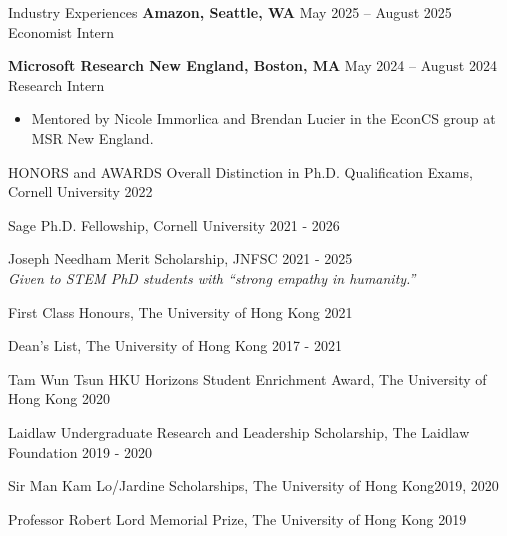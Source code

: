 \documentclass{resume} %
\begin{document}
\begin{rSection}{Industry Experiences}
  {\bf Amazon, Seattle, WA} \hfill {May 2025 -- August 2025} \\
  Economist Intern \vspace{-0.5em}

  {\bf Microsoft Research New England, Boston, MA} \hfill {May 2024 -- August 2024} \\
  Research Intern \vspace{-0.5em}
  \begin{itemize}
    \itemsep-0.5em 
    \item Mentored by Nicole Immorlica and Brendan Lucier in the EconCS group at MSR New England.
  \end{itemize} 
  
\end{rSection}

\begin{rSection}{HONORS and AWARDS}
Overall Distinction in Ph.D. Qualification Exams, Cornell University \hfill 2022

Sage Ph.D. Fellowship, Cornell University \hfill 2021 - 2026

Joseph Needham Merit Scholarship, JNFSC \hfill 2021 - 2025 \\
\emph{Given to STEM PhD students with ``strong empathy in humanity.''}

First Class Honours, The University of Hong Kong \hfill 2021

Dean's List, The University of Hong Kong \hfill 2017 - 2021

Tam Wun Tsun HKU Horizons Student Enrichment Award, The University of Hong Kong \hfill 2020

Laidlaw Undergraduate Research and Leadership Scholarship, The Laidlaw Foundation \hfill 2019 - 2020

Sir Man Kam Lo/Jardine Scholarships, The University of Hong Kong\hfill 2019, 2020

Professor Robert Lord Memorial Prize, The University of Hong Kong \hfill 2019 

\end{rSection}
\end{document}
